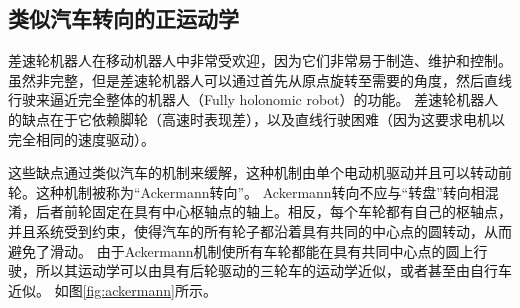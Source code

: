 \subsection{类似汽车转向的正运动学}

差速轮机器人在移动机器人中非常受欢迎，因为它们非常易于制造、维护和控制。虽然非完整，但是差速轮机器人可以通过首先从原点旋转至需要的角度，然后直线行驶来逼近完全整体的机器人（Fully holonomic robot）的功能。 差速轮机器人的缺点在于它依赖脚轮（高速时表现差），以及直线行驶困难（因为这要求电机以完全相同的速度驱动）。


这些缺点通过类似汽车的机制来缓解，这种机制由单个电动机驱动并且可以转动前轮。这种机制被称为“Ackermann转向”。 Ackermann转向不应与“转盘”转向相混淆，后者前轮固定在具有中心枢轴点的轴上。相反，每个车轮都有自己的枢轴点，并且系统受到约束，使得汽车的所有轮子都沿着具有共同的中心点的圆转动，从而避免了滑动。 由于Ackermann机制使所有车轮都能在具有共同中心点的圆上行驶，所以其运动学可以由具有后轮驱动的三轮车的运动学近似，或者甚至由自行车近似。 如图\ref{fig:ackermann}所示。


